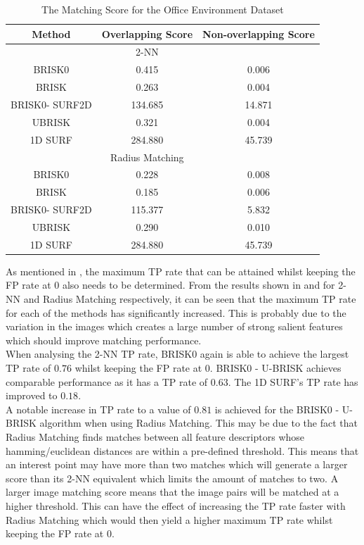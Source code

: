 \documentclass{report}
\begin{document}
\begin{table}
\caption{The Matching Score for the Office Environment Dataset}
\begin{tabular}{|c|c|c|}
\hline 
Method & Overlapping Score & Non-overlapping Score\tabularnewline
\hline 
\hline 
 & 2-NN & \tabularnewline
\hline 
BRISK0 & 0.415 & 0.006\tabularnewline
\hline 
BRISK & 0.263 & 0.004\tabularnewline
\hline 
BRISK0- SURF2D & 134.685 & 14.871\tabularnewline
\hline 
UBRISK & 0.321 & 0.004\tabularnewline
\hline 
1D SURF & 284.880 & 45.739\tabularnewline
\hline 
 & Radius Matching & \tabularnewline
\hline 
BRISK0 & 0.228 & 0.008\tabularnewline
\hline 
BRISK & 0.185 & 0.006\tabularnewline
\hline 
BRISK0- SURF2D & 115.377 & 5.832\tabularnewline
\hline 
UBRISK & 0.290 & 0.010\tabularnewline
\hline 
1D SURF & 284.880 & 45.739\tabularnewline
\hline 
\end{tabular}
\label{tab:oeMS}
\end{table}



As mentioned in , the maximum TP rate that can be attained whilst keeping the FP rate at $0$ also needs to be determined. From the results shown in  and  for 2-NN and Radius Matching respectively, it can be seen that the maximum TP rate for each of the methods has significantly increased. This is probably due to the variation in the images which creates a large number of strong salient features which should improve matching performance.\\

When analysing the 2-NN TP rate, BRISK0 again is able to achieve the largest TP rate of $0.76$ whilst keeping the FP rate at $0$. BRISK0 - U-BRISK achieves comparable performance as it has a TP rate of $0.63$. The 1D SURF's TP rate has improved to $0.18$.\\

A notable increase in TP rate to a value of $0.81$ is achieved for the BRISK0 - U-BRISK algorithm when using Radius Matching. This may be due to the fact that Radius Matching finds matches between all feature descriptors whose hamming/euclidean distances are within a pre-defined threshold. This means that an interest point may have more than two matches which will generate a larger score than its 2-NN equivalent which limits the amount of matches to two. A larger image matching score means that the image pairs will be matched at a higher threshold. This can have the effect of increasing the TP rate faster with Radius Matching which would then yield a higher maximum TP rate whilst keeping the FP rate at $0$.\\
\end{document}
